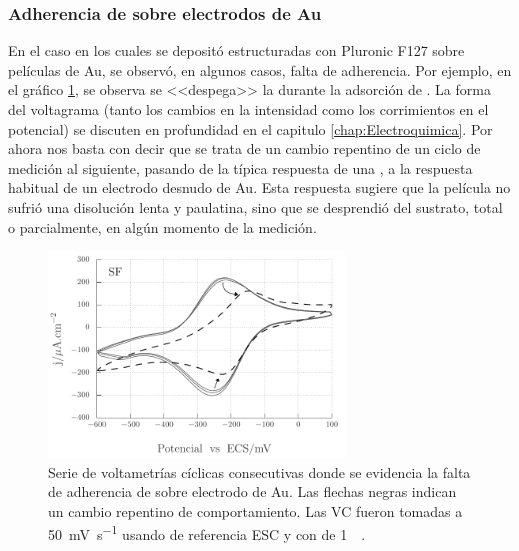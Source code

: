 		\subsubsection{Adherencia de \pdm\space sobre electrodos de Au}

			En el caso en los cuales se depositó \pdm\space estructuradas con Pluronic F127 sobre películas de Au, se observó, en algunos casos, falta de adherencia. Por ejemplo, en el gráfico \ref{fig:adherencia_F127}, se observa se <<despega>> la \pdm\space durante la adsorción de \aminorutenio. La forma del voltagrama (tanto los cambios en la intensidad como los corrimientos en el potencial) se discuten en profundidad en el capitulo \ref{chap:Electroquimica}. Por ahora nos basta con decir que se trata de un cambio repentino de un ciclo de medición al siguiente, pasando de la típica respuesta de una \pdm, a la respuesta habitual de un electrodo desnudo de Au. Esta respuesta sugiere que la película no sufrió una disolución lenta y paulatina, sino que se desprendió del sustrato, total o parcialmente, en algún momento de la medición.
			
				\begin{figure}[th]
				 	   	    \begin{center} 
				        	\includegraphics[width=0.70\textwidth]{Graficos/Adherencia_F127.pdf}
				       		\caption[Adherencia de \pdmF \space sobre una película delgada de Au.]{Serie de voltametrías cíclicas consecutivas donde se evidencia la falta de adherencia de \pdmF \space sobre electrodo de Au. Las flechas negras indican un cambio repentino de comportamiento. Las VC fueron tomadas a \SI{50}{\milli\volt.\second^{-1}} usando de referencia ESC y con de \ru\space \SI{1}{\milli\Molar}.}
				         	\label{fig:adherencia_F127}
				     		\end{center}
				     		\end{figure}

